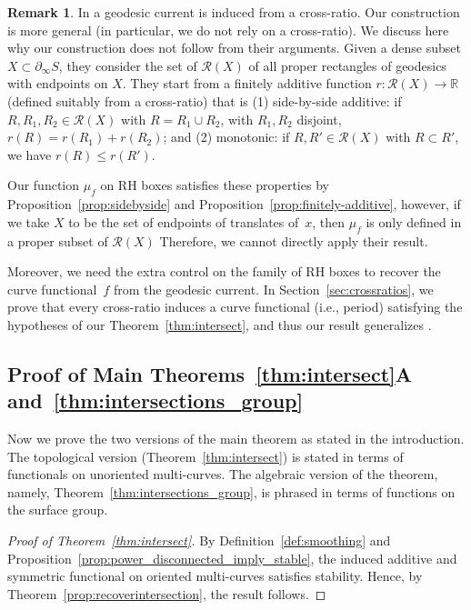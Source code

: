 \documentclass[11pt]{amsart}
\numberwithin{equation}{section}
\numberwithin{figure}{section}
\theoremstyle{definition}
\newtheorem{remark}[theorem]{Remark}
\theoremstyle{plain}
\begin{document}
\begin{remark}
In \cite[Proposition~4.3]{BIPP24:PositiveCrossratios} a geodesic current is induced
from a cross-ratio.
Our construction is more general (in particular, we do not rely on a cross-ratio).
We discuss here why our construction does not follow from their arguments.
Given a dense subset $X \subset \partial_{\infty} S$, they consider the set of $\mathcal{R}(X)$ of all proper rectangles of geodesics with endpoints on $X$.
They start from a finitely additive function $r \colon \mathcal{R}(X) \to \mathbb{R}$ (defined suitably from a cross-ratio)
that is (1) side-by-side additive: if $R,R_1,R_2 \in \mathcal{R}(X)$
with $R=R_1 \cup R_2$, with $R_1,R_2$ disjoint, $r(R)=r(R_1)+r(R_2)$;
and (2) monotonic: if $R,R' \in \mathcal{R}(X)$ with $R \subset R'$, we have $r(R) \leq r(R')$.

Our function $\mu_f$ on RH boxes satisfies these properties by Proposition~\ref{prop:sidebyside}
and Proposition~\ref{prop:finitely-additive}, however, if we take $X$ to
be the set of
endpoints of translates of~$x$, then $\mu_f$ is only
defined in a proper subset of $\mathcal{R}(X)$
Therefore, we cannot directly apply their result.

Moreover, we need the extra control on the family of RH
boxes to recover the curve functional~$f$ from the geodesic current.
In Section~\ref{sec:crossratios}, we prove that every cross-ratio induces a curve functional (i.e., period) satisfying the hypotheses of our Theorem~\ref{thm:intersect}, and thus our result generalizes \cite[Proposition~4.3]{BIPP24:PositiveCrossratios}.
\end{remark}




\subsection{Proof of  Main Theorems~\ref{thm:intersect}{A} and~\texorpdfstring{\ref{thm:intersections_group}}{A'}}

Now we prove the two versions of the main theorem as stated in the introduction. The topological version (Theorem~\ref{thm:intersect}) is stated in terms of functionals on unoriented multi-curves. The algebraic version of the
theorem, namely, Theorem~\ref{thm:intersections_group}, is phrased in terms of functions on the surface group.

\begin{proof}[Proof of Theorem~\ref{thm:intersect}]

By Definition~\ref{def:smoothing} and Proposition~\ref{prop:power_disconnected_imply_stable}, the induced additive and symmetric functional on oriented multi-curves satisfies stability. Hence, by Theorem~\ref{prop:recoverintersection}, the result follows.
\end{proof}
\end{document}
